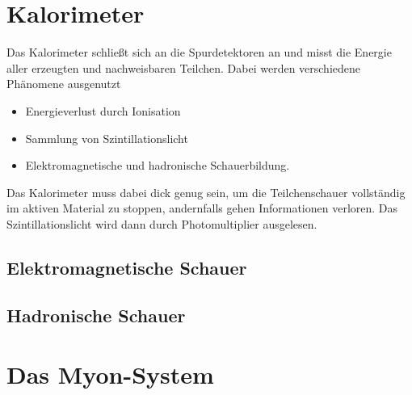 \section{Kalorimeter}
Das Kalorimeter schließt sich an die Spurdetektoren an und misst die Energie aller erzeugten und nachweisbaren Teilchen.
Dabei werden verschiedene Phänomene ausgenutzt
\begin{itemize}
	\item Energieverlust durch Ionisation
	\item Sammlung von Szintillationslicht
	\item Elektromagnetische und hadronische Schauerbildung.
\end{itemize}
Das Kalorimeter muss dabei dick genug sein, um die Teilchenschauer vollständig im aktiven Material zu stoppen, andernfalls gehen Informationen verloren.
Das Szintillationslicht wird dann durch Photomultiplier ausgelesen.
\subsection{Elektromagnetische Schauer}

\subsection{Hadronische Schauer}

\section{Das Myon-System}
